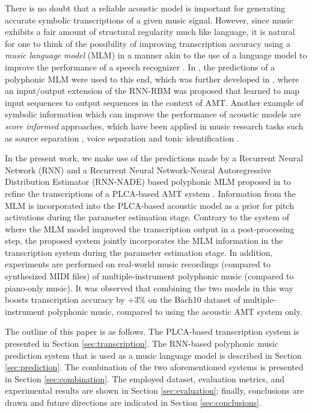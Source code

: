 There is no doubt that a reliable acoustic model is important for generating accurate symbolic transcriptions of a given music signal. However, since music exhibits a fair amount of structural regularity much like language, it is natural for one to think of the possibility of improving transcription accuracy using a \textit{music language model} (MLM) in a manner akin to the use of a language model to improve the performance of a speech recognizer \cite{Rabiner1993}. In \cite{Boulanger-Lewandowski2012}, the predictions of a polyphonic MLM were used to this end, which was further developed in \cite{Boulanger-Lewandowski2013}, where an input/output extension of the RNN-RBM was proposed that learned to map input sequences to output sequences in the context of AMT. Another example of symbolic information which can improve the performance of acoustic models are \textit{score informed} approaches, which have been applied in music research tasks such as source separation \cite{Ewert2012}, voice separation \cite{
Ewert2011} and tonic identification \cite{Senturk2013}. %

In the present work, we make use of the predictions made by a Recurrent Neural Network (RNN) and a Recurrent Neural Network-Neural Autoregressive Distribution Estimator (RNN-NADE) based polyphonic MLM proposed in \cite{Boulanger-Lewandowski2012} to refine the transcriptions of a PLCA-based AMT system \cite{Benetos2012, Benetos2013}. Information from the MLM is incorporated into the PLCA-based acoustic model as a prior for pitch activations during the parameter estimation stage. Contrary to the system of \cite{Boulanger-Lewandowski2012} where the MLM model improved the transcription output in a post-processing step, the proposed system jointly incorporates the MLM information in the transcription system during the parameter estimation stage. In addition, experiments are performed on real-world music recordings (compared to synthesized MIDI files) of multiple-instrument polyphonic music (compared to piano-only music). It was observed that combining the two models in this way boosts transcription accuracy by +3\% on the Bach10 dataset of multiple-instrument polyphonic music, compared to using the acoustic AMT system only.

The outline of this paper is as follows. The PLCA-based transcription system is presented in Section \ref{sec:transcription}. The RNN-based polyphonic music prediction system that is used as a music language model is described in Section \ref{sec:prediction}. The combination of the two aforementioned systems is presented in Section \ref{sec:combination}. The employed dataset, evaluation metrics, and experimental results are shown in Section \ref{sec:evaluation}; finally, conclusions are drawn and future directions are indicated in Section \ref{sec:conclusions}.